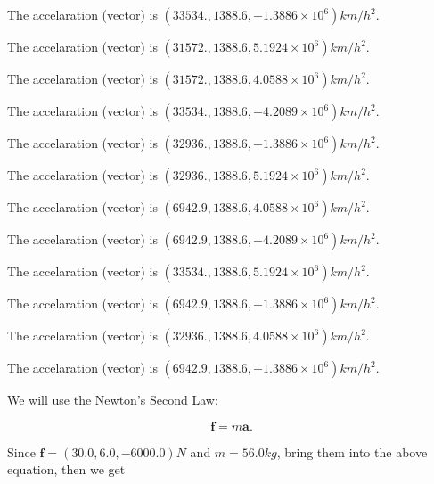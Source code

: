 \documentclass[12pt]{article}
\begin{document}
 
The accelaration (vector) is
$(
33534.,
1388.6 ,
-1.3886 \times 10^{6}
)km/h^2.
$
 
 
The accelaration (vector) is
$(
31572.,
1388.6 ,
5.1924 \times 10^{6}
)km/h^2.
$
 
 
The accelaration (vector) is
$(
31572.,
1388.6 ,
4.0588 \times 10^{6}
)km/h^2.
$
 
 
The accelaration (vector) is
$(
33534.,
1388.6 ,
-4.2089 \times 10^{6}
)km/h^2.
$
 
 
The accelaration (vector) is
$(
32936.,
1388.6 ,
-1.3886 \times 10^{6}
)km/h^2.
$
 
 
The accelaration (vector) is
$(
32936.,
1388.6 ,
5.1924 \times 10^{6}
)km/h^2.
$
 
 
The accelaration (vector) is
$(
6942.9,
1388.6 ,
4.0588 \times 10^{6}
)km/h^2.
$
 
 
The accelaration (vector) is
$(
6942.9,
1388.6 ,
-4.2089 \times 10^{6}
)km/h^2.
$
 
 
The accelaration (vector) is
$(
33534.,
1388.6 ,
5.1924 \times 10^{6}
)km/h^2.
$
 
 
The accelaration (vector) is
$(
6942.9,
1388.6 ,
-1.3886 \times 10^{6}
)km/h^2.
$
 
 
The accelaration (vector) is
$(
32936.,
1388.6 ,
4.0588 \times 10^{6}
)km/h^2.
$
 
 
\noindent{}
 
 
The accelaration (vector) is
$(
6942.9,
1388.6 ,
-1.3886 \times 10^{6}
)km/h^2.
$
 
 
\noindent{}
 
 
 
 
 
 
\noindent{}
 
 

We will use the Newton's Second Law:
 
\[
\mathbf{f}=m\mathbf{a}.
\]
 
Since $\mathbf{f}=( %
30.0,  %
6.0,  %
-6000.0 )N$
and $m= %
56.0 kg$, bring them into the above equation, then we get
 
\end{document}
